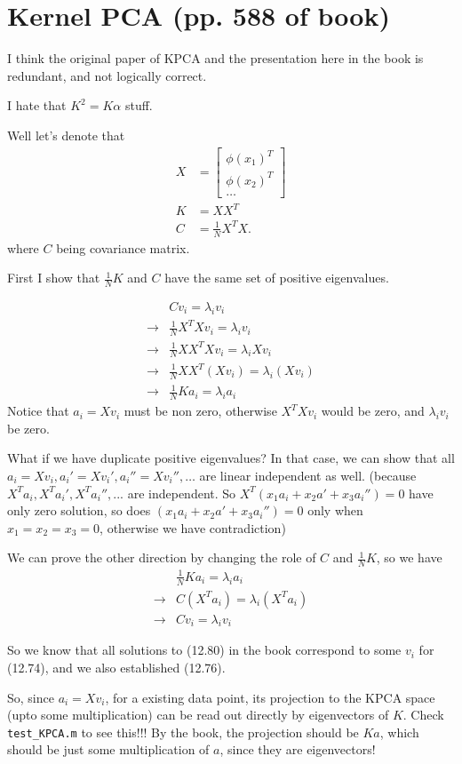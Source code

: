 \documentclass[12pt]{article}
\begin{document}

\section{Kernel PCA (pp. 588 of book)} %
\label{sec:kernel_pca_}

I think the original paper of KPCA and the presentation here in the book is redundant, and not logically correct.

I hate that $K^2 = K\alpha$ stuff.

Well let's denote that 
\begin{align}
X &= \begin{bmatrix}
    \phi(x_1)^T \\
    \phi(x_2)^T \\
    \ldots
\end{bmatrix}\\
K &= X X^T \\
C &= \frac{1}{N} X^T X.
\end{align}
where $C$ being covariance matrix.

First I show that $\frac{1}{N} K$ and $C$ have the same set of positive eigenvalues.

\begin{align}
  & C v_i = \lambda_i v_i\\
\rightarrow & \frac{1}{N} X^T X v_i  = \lambda_i v_i\\
\rightarrow & \frac{1}{N} X X^T X v_i  =  \lambda_i X v_i\\
\rightarrow & \frac{1}{N} X X^T (X v_i)  =  \lambda_i (X v_i)\\
\rightarrow & \frac{1}{N} K a_i  =  \lambda_i a_i
\end{align}
Notice that $a_i = X v_i$ must be non zero, otherwise $ X^T X v_i$ would be zero, and $ \lambda_i v_i$ be zero.

What if we have duplicate positive eigenvalues? In that case, we can show that all $a_i = X v_i, a_i' = X v_i', a_i'' = X v_i'', \ldots$ are linear independent as well. (because $X^T a_i, X^T a_i', X^T a_i'', ...$ are independent. So $X^T (x_1 a_i + x_2 a' + x_3 a_i'') = 0 $ have only zero solution, so does $(x_1 a_i + x_2 a' + x_3 a_i'') = 0$ only when $x_1=x_2=x_3=0$, otherwise we have contradiction)

We can prove the other direction by changing the role of $C$ and $\frac{1}{N} K$, so we have
\begin{align}
& \frac{1}{N} K a_i  =  \lambda_i a_i \\
\rightarrow & C (X^T a_i) = \lambda_i (X^T a_i) \\
\rightarrow & C v_i = \lambda_i v_i 
\end{align}

So we know that all solutions to (12.80) in the book correspond to some $v_i$ for (12.74), and we also established (12.76).

So, since $a_i = X v_i$, for a existing data point, its projection to the KPCA space (upto some multiplication) can be read out directly by eigenvectors of $K$. Check \texttt{test\_KPCA.m} to see this!!! By the book, the projection should be $Ka$, which should be just some multiplication of $a$, since they are eigenvectors!

\end{document}
